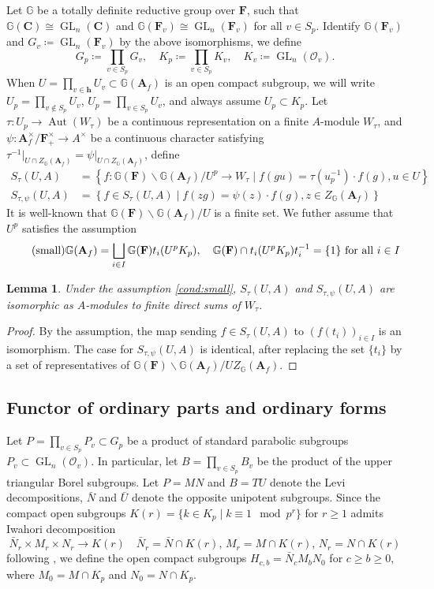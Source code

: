 \documentclass[leqno]{amsart}
\newcommand{\GG}{\mathbb G}
\DeclareMathOperator{\GL}{GL}
\newcommand{\C}{\mathbf C}
\newcommand{\A}{\mathbf A}
\newcommand{\finite}{\mathbf{h}}
\newcommand{\F}{{\mathbf{F}}} %
\newcommand{\oo}{\mathcal O}
\newcommand{\1}{\mathbf{1}}
\DeclareMathOperator{\Aut}{Aut}
\newtheorem{lem}[thm]{Lemma}
\theoremstyle{definition}
\theoremstyle{remark}
\begin{document}
Let  $\GG$ be a totally definite reductive group over  $\F$,
such that  $\GG(\C)\cong \GL_n(\C)$
and $\GG(\F_v)\cong \GL_n(\F_v)$
for all  $v\in S_p$.
Identify $\GG(\F_v)$
and  $G_v\coloneqq \GL_n(\F_v)$ by the above isomorphisms,
we define 
\[
	G_p\coloneqq\prod_{v\in S_p}G_v,\quad
	K_p\coloneqq\prod_{v\in S_p}K_v,\quad
	K_v\coloneqq\GL_n(\oo_v).
\]
When $U=\prod_{v\in\finite}U_v\subset \GG(\A_f)$
is an open compact subgroup, 
we will write 
$U_p=\prod_{v\notin S_p}U_v$,
$U_p=\prod_{v\in S_p}U_v$,
and always assume $U_p\subset K_p$.
Let $\tau\colon U_p\to \Aut(W_\tau)$
be a continuous representation on a finite  $A$-module  $W_\tau$,
and $\psi\colon \A_f^\times/\F_+^\times\to A^\times$ 
be a continuous character satisfying
$\tau^{-1}\vert_{U\cap Z_{\GG}(\A_f)}=\psi|_{U\cap Z_{\GG}(\A_f)}$,
define
\begin{align}
S_{\tau}(U,A)&=
\left\{ f: \GG(\F)\backslash \GG(\A_f)/U^p \rightarrow W_\tau 
\mid f(gu)=\tau(u_p^{-1})\cdot f(g), u\in U\right\} \\
S_{\tau,\psi}(U,A)&=\left\{
f\in S_{\tau}(U,A)
\mid f(zg)=\psi(z)\cdot f(g), z\in Z_{\GG}(\A_f)\right\} 
\end{align}
It is well-known that 
$\GG(\F)\backslash \GG(\A_f)/U$ is a finite set.
We futher assume that $U^p$ satisfies the assumption
\begin{equation}\label{cond:small}\tag{\text{small}}
	\GG(\A_f)=\bigsqcup_{i\in I}
	\GG(\F)t_i (U^pK_p),\quad
	\GG(\F)\cap t_i(U^pK_p)t_i^{-1}=\{1\} \text{ for all } i\in I
\end{equation}
\begin{lem}\label{lem:small}
	Under the assumption \eqref{cond:small},
	$S_\tau(U,A)$ and $S_{\tau,\psi}(U,A)$
	are isomorphic as $A$-modules
	to finite direct sums of $W_\tau$.
\end{lem}
\begin{proof}
	By the assumption,
	the map sending $f\in S_\tau(U,A)$ to 
	$(f(t_i))_{i\in I}$ is an isomorphism.
	The case for $S_{\tau,\psi}(U,A)$ is identical,
	after replacing the set $\{t_i\}$
	by a set of representatives of 
	$\GG(\F)\backslash \GG(\A_f)/UZ_\GG(\A_f)$.
\end{proof}

\subsection{Functor of ordinary parts and ordinary forms}

Let $P=\prod_{v\in S_p}P_v\subset G_p$ be a product 
of standard parabolic subgroups $P_v\subset \GL_n(\oo_v)$.
In particular, let  $B=\prod_{v\in S_p}B_v$
be the product of the upper triangular Borel subgroups.
Let $P=MN$ and  $B=TU$ denote the Levi decompositions,
$\bar{N}$ and $\bar{U}$ denote the opposite unipotent subgroups.
Since the compact open subgroups
$K(r)=\{k\in K_p\mid k\equiv 1\mod p^r\}$ 
for $r\geq 1$
admits Iwahori decomposition
\[
	\bar{N}_r\times M_r\times N_r\to K(r)\quad
	\bar{N}_r=\bar{N}\cap K(r),\,
	M_r=M\cap K(r),\,
	N_r=N\cap K(r)
\]
following \cite[\S 3.3]{emeI},
we define the open compact subgroups
$H_{c,b}=\bar{N}_cM_bN_0$
for $c\geq b\geq 0$,
where $M_0=M\cap K_p$ and
$N_0=N\cap K_p$.
\end{document}
